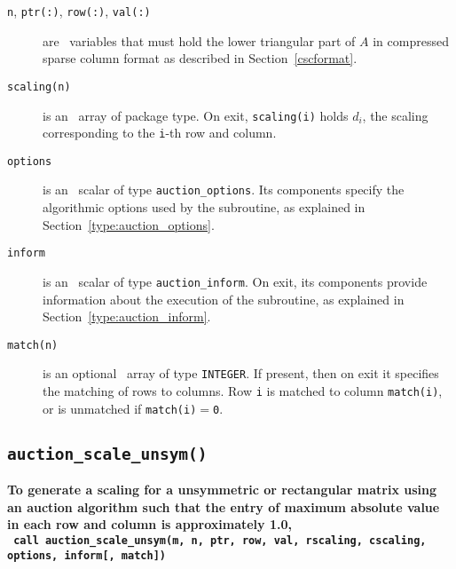 \begin{description}

\item[\texttt{n}, \texttt{ptr(:)}, \texttt{row(:)}, \texttt{val(:)}] are \intentin\ variables that must hold the lower triangular part of $A$ in compressed sparse column format as described in Section~\ref{cscformat}.

\item[\texttt{scaling(n)}] is an \intentout\ array of package type. On exit,
\texttt{scaling(i)} holds $d_i$, the scaling corresponding to the
\texttt{i}-th row and column.

\item[\texttt{options}] is an \intentin\ scalar of type \texttt{auction\_options}. Its components specify the algorithmic options used by the subroutine, as explained in Section~\ref{type:auction_options}.

\item[\texttt{inform}] is an \intentout\ scalar of type \texttt{auction\_inform}. On exit, its components provide information about the execution of the subroutine, as explained in Section~\ref{type:auction_inform}.

\item[\texttt{match(n)}] is an optional \intentout\ array of type {\tt INTEGER}. If present, then on exit it specifies the matching of rows to
columns. Row \texttt{i} is matched to column \texttt{match(i)}, or is unmatched
if \texttt{match(i)}$=$\texttt{0}.

\end{description}

\subsection{\texttt{auction\_scale\_unsym()}}

\textbf{\noindent
   To generate a scaling for a unsymmetric or rectangular matrix using an auction algorithm such that the entry of maximum absolute value in each row and column is approximately 1.0,
   \vspace*{0.3cm} \\
   \texttt{ \hspace*{0.2cm}
      call auction\_scale\_unsym(m, n, ptr, row, val, rscaling, cscaling, options, inform[, match])
   }
}

